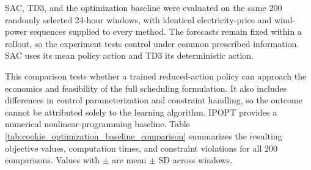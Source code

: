 \documentclass[12pt]{article}
\begin{document}
SAC, TD3, and the optimization baseline were evaluated on the same 200 randomly selected 24-hour windows, with identical electricity-price and wind-power sequences supplied to every method. The forecasts remain fixed within a rollout, so the experiment tests control under common prescribed information. SAC uses its mean policy action and TD3 its deterministic action.

This comparison tests whether a trained reduced-action policy can approach the economics and feasibility of the full scheduling formulation. It also includes differences in control parameterization and constraint handling, so the outcome cannot be attributed solely to the learning algorithm. IPOPT provides a numerical nonlinear-programming baseline. Table \ref{tab:cookie_optimization_baseline_comparison} summarizes the resulting objective values, computation times, and constraint violations for all 200 comparisons. Values with $\pm$ are mean $\pm$ SD across windows.
\end{document}
